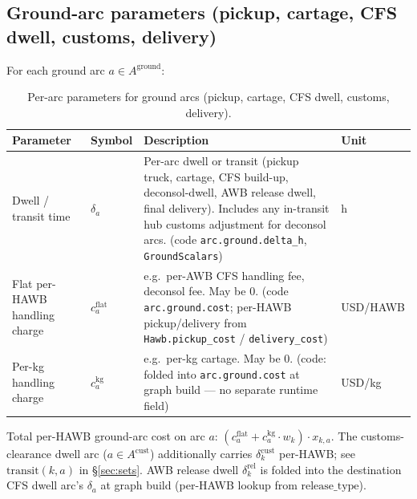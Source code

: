 \documentclass[11pt,a4paper]{article}
\theoremstyle{definition}
\begin{document}
\subsection{Ground-arc parameters (pickup, cartage, CFS dwell, customs, delivery)}
\label{sec:ground-arc-params}

For each ground arc $a \in A^{\text{ground}}$:

\begin{table}[H]
\centering
\caption{Per-arc parameters for ground arcs (pickup, cartage, CFS dwell, customs, delivery).}
\label{tab:ground-arc-params}
\begin{tabular}{p{3.5cm}p{2.2cm}p{6.5cm}p{1.5cm}}
\toprule
Parameter & Symbol & Description & Unit \\
\midrule
Dwell / transit time & $\delta_a$ & Per-arc dwell or transit (pickup truck, cartage, CFS build-up, deconsol-dwell, AWB release dwell, final delivery). Includes any in-transit hub customs adjustment for deconsol arcs. (code \texttt{arc.ground.delta\_h}, \texttt{GroundScalars}) & h \\
Flat per-HAWB handling charge & $c_a^{\text{flat}}$ & e.g.\ per-AWB CFS handling fee, deconsol fee. May be 0. (code \texttt{arc.ground.cost}; per-HAWB pickup/delivery from \texttt{Hawb.pickup\_cost} / \texttt{delivery\_cost}) & USD/HAWB \\
Per-kg handling charge & $c_a^{\text{kg}}$ & e.g.\ per-kg cartage. May be 0. (code: folded into \texttt{arc.ground.cost} at graph build --- no separate runtime field) & USD/kg \\
\bottomrule
\end{tabular}
\end{table}

Total per-HAWB ground-arc cost on arc $a$: $(c_a^{\text{flat}} + c_a^{\text{kg}}
\cdot w_k) \cdot x_{k,a}$. The customs-clearance dwell arc (\(a \in
A^{\text{cust}}\)) additionally carries $\delta^{\text{cust}}_k$ per-HAWB; see
\(\text{transit}(k, a)\) in \S\ref{sec:sets}. AWB release dwell
$\delta^{\text{rel}}_k$ is folded into the destination CFS dwell arc's
$\delta_a$ at graph build (per-HAWB lookup from $\text{release\_type}$).
\end{document}
